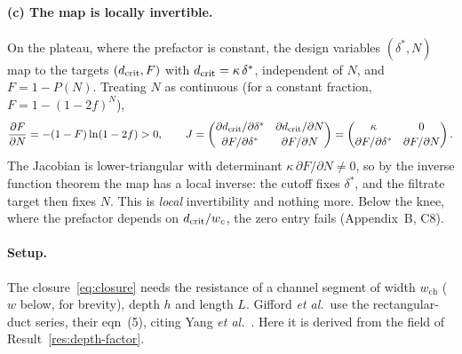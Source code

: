 \paragraph{(c) The map is locally invertible.} On the plateau, where the prefactor is constant,
the design variables $(\delta^*,N)$ map to the targets $(d_{\mathrm{crit}},F)$ with
$d_{\mathrm{crit}}=\kappa\,\delta^*$, independent of $N$, and $F=1-P(N)$. Treating $N$ as continuous
(for a constant fraction, $F=1-(1-2f)^N$),
\begin{equation}
\frac{\partial F}{\partial N}=-(1-F)\ln(1-2f)>0 ,
\qquad
J=\begin{pmatrix}\partial d_{\mathrm{crit}}/\partial\delta^* & \partial d_{\mathrm{crit}}/\partial N\\[2pt]
\partial F/\partial\delta^* & \partial F/\partial N\end{pmatrix}
=\begin{pmatrix}\kappa & 0\\[2pt] \partial F/\partial\delta^* & \partial F/\partial N\end{pmatrix}.
\end{equation}
The Jacobian is lower-triangular with determinant $\kappa\,\partial F/\partial N\neq0$, so by the
inverse function theorem the map has a local inverse: the cutoff fixes $\delta^*$, and the
filtrate target then fixes $N$. This is \emph{local} invertibility and nothing more. Below the
knee, where the prefactor depends on $d_{\mathrm{crit}}/w_c$, the zero entry fails (Appendix~B, C8).

\label{res:resistance}

\paragraph{Setup.} The closure~\eqref{eq:closure} needs the resistance of a channel segment of
width $w_{\mathrm{ch}}$ ($w$ below, for brevity), depth $h$ and length $L$. Gifford \emph{et al.}\ use the rectangular-duct series, their
eqn~(5), citing Yang \emph{et al.}\ \cite{b1,b6}. Here it is derived from the field
of Result~\ref{res:depth-factor}.

